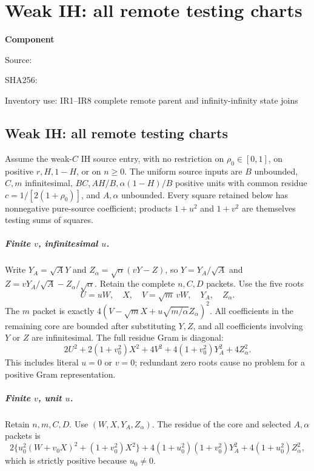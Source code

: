 \chapter{Weak IH: all remote testing charts}
\label{component:p0fb32cd2f1bc}
\noindent\textbf{Component }\par
{\small\noindent Source: \par}
{\small\noindent SHA256: \par}
{\small\noindent Inventory use: IR1--IR8 complete remote parent and infinity-infinity state joins\par}
\medskip
\section{Weak IH: all remote testing charts}
\label{p0fb32cd2f1bc:sec:weak-ih-remote}
Assume the weak-$C$ IH source entry, with no restriction on
$\rho_0\in[0,1]$, on positive $r,H,1-H$, or on $n\ge0$.
The uniform source inputs are $B$ unbounded, $C,m$ infinitesimal,
$BC,AH/B,\alpha(1-H)/B$ positive units with common residue
$c=1/[2(1+\rho_0)]$, and $A,\alpha$ unbounded.
Every square retained below has nonnegative pure-source coefficient;
products $1+u^2$ and $1+v^2$ are themselves testing sums of squares.

\paragraph{Finite $v$, infinitesimal $u$.}
Write $Y_A=\sqrt A Y$ and $Z_\alpha=\sqrt\alpha(vY-Z)$, so
$Y=Y_A/\sqrt A$ and $Z=vY_A/\sqrt A-Z_\alpha/\sqrt\alpha$.
Retain the complete $n,C,D$ packets. Use the five roots
\[
 U=uW,\quad X,\quad V=\sqrt m\,vW,\quad Y_A,\quad Z_\alpha.
\]
The $m$ packet is exactly
$4(V-\sqrt m X+u\sqrt{m/\alpha}Z_\alpha)^2$.
All coefficients in the remaining core are bounded after substituting
$Y,Z$, and all coefficients involving $Y$ or $Z$ are infinitesimal.
The full residue Gram is diagonal:
\[
 2U^2+2(1+v_0^2)X^2+4V^2
       +4(1+v_0^2)Y_A^2+4Z_\alpha^2.
\tag{IR1}
\]
This includes literal $u=0$ or $v=0$; redundant zero roots cause no
problem for a positive Gram representation.

\paragraph{Finite $v$, unit $u$.}
Retain $n,m,C,D$. Use $(W,X,Y_A,Z_\alpha)$.
The residue of the core and selected $A,\alpha$ packets is
\[
 2\{u_0^2(W+v_0X)^2+(1+v_0^2)X^2\}
       +4(1+u_0^2)(1+v_0^2)Y_A^2
       +4(1+u_0^2)Z_\alpha^2,
\tag{IR2}
\]
which is strictly positive because $u_0\ne0$.

